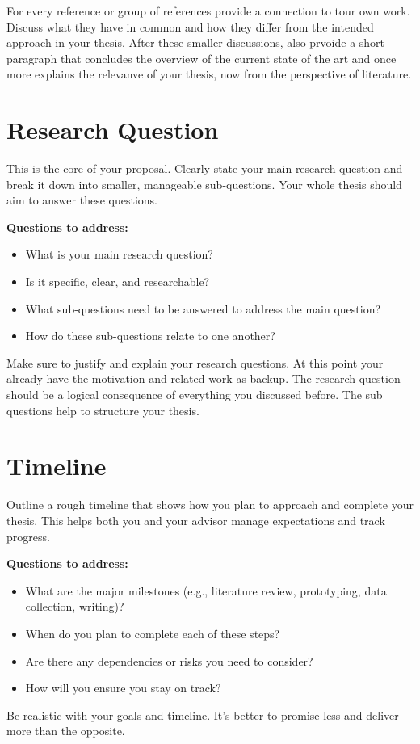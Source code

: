 \documentclass{article}
\begin{document}
For every reference or group of references provide a connection to tour own work. Discuss what they have in common and how they differ from the intended approach in your thesis. After these smaller discussions, also prvoide a short paragraph that concludes the overview of the current state of the art and once more explains the relevanve of your thesis, now from the perspective of literature.

\section*{Research Question}
This is the core of your proposal. Clearly state your main research question and break it down into smaller, manageable sub-questions. Your whole thesis should aim to answer these questions.

\textbf{Questions to address:}
\begin{itemize}[label=--]
  \item What is your main research question?
  \item Is it specific, clear, and researchable?
  \item What sub-questions need to be answered to address the main question?
  \item How do these sub-questions relate to one another?
\end{itemize}

Make sure to justify and explain your research questions. At this point your already have the motivation and related work as backup. The research question should be a logical consequence of everything you discussed before. The sub questions help to structure your thesis.

\section*{Timeline}
Outline a rough timeline that shows how you plan to approach and complete your thesis. This helps both you and your advisor manage expectations and track progress.

\textbf{Questions to address:}
\begin{itemize}[label=--]
  \item What are the major milestones (e.g., literature review, prototyping, data collection, writing)?
  \item When do you plan to complete each of these steps?
  \item Are there any dependencies or risks you need to consider?
  \item How will you ensure you stay on track?
\end{itemize}

\vspace{1em}
\begin{tcolorbox}[colback=blue!5!white, colframe=blue!50!black, title=Tip]
Be realistic with your goals and timeline. It's better to promise less and deliver more than the opposite.
\end{tcolorbox}



\end{document}
